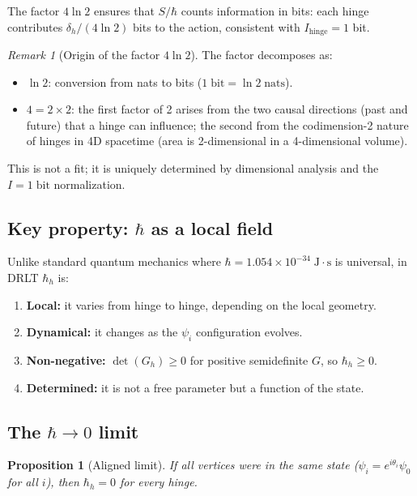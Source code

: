 \documentclass[12pt]{article}
\newtheorem{proposition}[theorem]{Proposition}
\theoremstyle{remark}
\newtheorem{remark}[theorem]{Remark}
\theoremstyle{definition}
\begin{document}
The factor $4\ln 2$ ensures that $S/\hbar$ counts information in bits: each hinge contributes $\delta_h/(4\ln 2)$ bits to the action, consistent with $I_\text{hinge} = 1$ bit.

\begin{remark}[Origin of the factor $4\ln 2$]
The factor decomposes as:
\begin{itemize}
\item $\ln 2$: conversion from nats to bits ($1\;\text{bit} = \ln 2\;\text{nats}$).
\item $4 = 2 \times 2$: the first factor of 2 arises from the two causal directions (past and future) that a hinge can influence; the second from the codimension-2 nature of hinges in 4D spacetime (area is 2-dimensional in a 4-dimensional volume).
\end{itemize}
This is not a fit; it is uniquely determined by dimensional analysis and the $I = 1\;\text{bit}$ normalization.
\end{remark}

\subsection{Key property: $\hbar$ as a local field}

Unlike standard quantum mechanics where $\hbar = 1.054 \times 10^{-34}\;\text{J}\cdot\text{s}$ is universal, in DRLT $\hbar_h$ is:

\begin{enumerate}
\item \textbf{Local:} it varies from hinge to hinge, depending on the local geometry.
\item \textbf{Dynamical:} it changes as the $\psi_i$ configuration evolves.
\item \textbf{Non-negative:} $\det(G_h) \geq 0$ for positive semidefinite $G$, so $\hbar_h \geq 0$.
\item \textbf{Determined:} it is not a free parameter but a function of the state.
\end{enumerate}

\subsection{The $\hbar \to 0$ limit}

\begin{proposition}[Aligned limit]
If all vertices were in the same state ($\psi_i = e^{i\theta_i}\psi_0$ for all $i$), then $\hbar_h = 0$ for every hinge.
\end{proposition}
\end{document}
